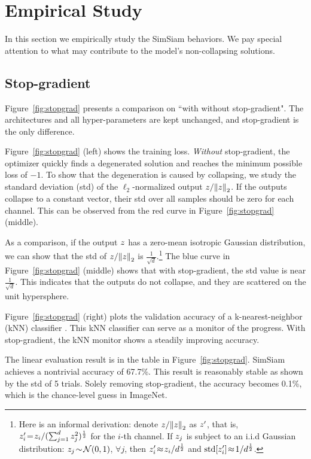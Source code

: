 \documentclass[final]{cvpr}
\begin{document}
\section{Empirical Study\label{sec:exp}}

In this section we empirically study the SimSiam behaviors. We pay special attention to what may contribute to the model's non-collapsing solutions. 

\subsection{Stop-gradient}\label{subsec:stopgrad}

Figure~\ref{fig:stopgrad} presents a comparison on ``with \vs without stop-gradient". The architectures and all hyper-parameters are kept unchanged, and stop-gradient is the only difference.

Figure~\ref{fig:stopgrad} (left) shows the training loss. \emph{Without} stop-gradient, the optimizer quickly finds a degenerated solution and reaches the minimum possible loss of $-1$.
To show that the degeneration is caused by collapsing, we study the standard deviation (std) of the $\ell_2$-normalized output ${{z}}/{\left\lVert{{z}}\right\rVert _2}$. If the outputs collapse to a constant vector, their std over all samples should be zero for each channel.
This can be observed from the red curve in Figure~\ref{fig:stopgrad} (middle). 

As a comparison, if the output ${z}$ has a zero-mean isotropic Gaussian distribution, we can show that the std of ${{z}}/{\left\lVert{{z}}\right\rVert _2}$ is $\frac{1}{\sqrt{d}}$.\footnote{
Here is an informal derivation:
denote ${{z}}/{\left\lVert{{z}}\right\rVert _2}$ as ${z}'$, that is, ${z}'_{i}\!=\!{z}_{i} / (\sum_{j=1}^{d}{z}^2_{j})^\frac{1}{2}$ for the $i$-th channel.
If ${z}_{j}$ is subject to an i.i.d Gaussian distribution: ${z}_{j}\!\sim\!\mathcal{N}(0, 1)$, $\forall j$, then ${z}'_{i}\!\approx\!{z}_{i} / d^\frac{1}{2}$ and $\text{{std}}[{z}'_{i}]\!\approx\!1/d^\frac{1}{2}$.
} 
The blue curve in Figure~\ref{fig:stopgrad} (middle) shows that with stop-gradient, the std value is near $\frac{1}{\sqrt{d}}$. This indicates that the outputs do not collapse, and they are scattered on the unit hypersphere.

Figure~\ref{fig:stopgrad} (right) plots the validation accuracy of a k-nearest-neighbor (kNN) classifier \cite{Wu2018a}. This kNN classifier can serve as a monitor of the progress. With stop-gradient, the kNN monitor shows a steadily improving accuracy.

The linear evaluation result is in the table in Figure~\ref{fig:stopgrad}. SimSiam achieves a nontrivial accuracy of 67.7\%. This result is reasonably stable as shown by the std of 5 trials.
Solely removing stop-gradient, the accuracy becomes 0.1\%, which is the chance-level guess in ImageNet.
\end{document}

